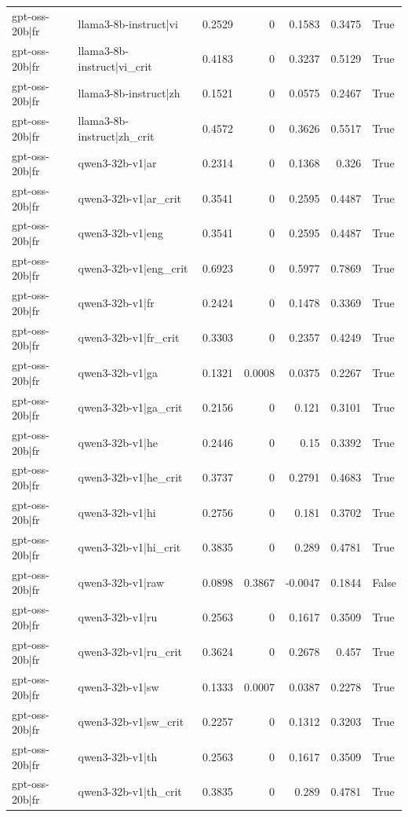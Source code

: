 \begin{table}
\begin{tabular}{l l r r r r l}
gpt-oss-20b|fr & llama3-8b-instruct|vi & 0.2529 & 0 & 0.1583 & 0.3475 & True \\
gpt-oss-20b|fr & llama3-8b-instruct|vi_crit & 0.4183 & 0 & 0.3237 & 0.5129 & True \\
gpt-oss-20b|fr & llama3-8b-instruct|zh & 0.1521 & 0 & 0.0575 & 0.2467 & True \\
gpt-oss-20b|fr & llama3-8b-instruct|zh_crit & 0.4572 & 0 & 0.3626 & 0.5517 & True \\
gpt-oss-20b|fr & qwen3-32b-v1|ar & 0.2314 & 0 & 0.1368 & 0.326 & True \\
gpt-oss-20b|fr & qwen3-32b-v1|ar_crit & 0.3541 & 0 & 0.2595 & 0.4487 & True \\
gpt-oss-20b|fr & qwen3-32b-v1|eng & 0.3541 & 0 & 0.2595 & 0.4487 & True \\
gpt-oss-20b|fr & qwen3-32b-v1|eng_crit & 0.6923 & 0 & 0.5977 & 0.7869 & True \\
gpt-oss-20b|fr & qwen3-32b-v1|fr & 0.2424 & 0 & 0.1478 & 0.3369 & True \\
gpt-oss-20b|fr & qwen3-32b-v1|fr_crit & 0.3303 & 0 & 0.2357 & 0.4249 & True \\
gpt-oss-20b|fr & qwen3-32b-v1|ga & 0.1321 & 0.0008 & 0.0375 & 0.2267 & True \\
gpt-oss-20b|fr & qwen3-32b-v1|ga_crit & 0.2156 & 0 & 0.121 & 0.3101 & True \\
gpt-oss-20b|fr & qwen3-32b-v1|he & 0.2446 & 0 & 0.15 & 0.3392 & True \\
gpt-oss-20b|fr & qwen3-32b-v1|he_crit & 0.3737 & 0 & 0.2791 & 0.4683 & True \\
gpt-oss-20b|fr & qwen3-32b-v1|hi & 0.2756 & 0 & 0.181 & 0.3702 & True \\
gpt-oss-20b|fr & qwen3-32b-v1|hi_crit & 0.3835 & 0 & 0.289 & 0.4781 & True \\
gpt-oss-20b|fr & qwen3-32b-v1|raw & 0.0898 & 0.3867 & -0.0047 & 0.1844 & False \\
gpt-oss-20b|fr & qwen3-32b-v1|ru & 0.2563 & 0 & 0.1617 & 0.3509 & True \\
gpt-oss-20b|fr & qwen3-32b-v1|ru_crit & 0.3624 & 0 & 0.2678 & 0.457 & True \\
gpt-oss-20b|fr & qwen3-32b-v1|sw & 0.1333 & 0.0007 & 0.0387 & 0.2278 & True \\
gpt-oss-20b|fr & qwen3-32b-v1|sw_crit & 0.2257 & 0 & 0.1312 & 0.3203 & True \\
gpt-oss-20b|fr & qwen3-32b-v1|th & 0.2563 & 0 & 0.1617 & 0.3509 & True \\
gpt-oss-20b|fr & qwen3-32b-v1|th_crit & 0.3835 & 0 & 0.289 & 0.4781 & True \\

\end{tabular}
\end{table}
